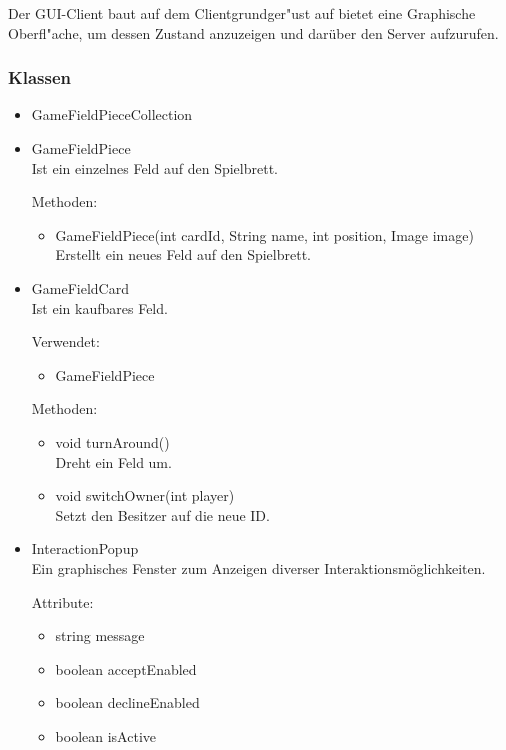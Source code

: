\documentclass[a4paper,10pt]{article}
\begin{document}
Der GUI-Client baut auf dem Clientgrundger"ust auf bietet eine Graphische Oberfl"ache, um dessen Zustand anzuzeigen und darüber den Server aufzurufen.

\subsubsection{Klassen}

\begin{itemize}
\item GameFieldPieceCollection\\

\item GameFieldPiece\\
Ist ein einzelnes Feld auf den Spielbrett.

Methoden:
\begin{itemize}
\item GameFieldPiece(int cardId, String name, int position, Image image)
Erstellt ein neues Feld auf den Spielbrett.
\end{itemize}

\item GameFieldCard \\
Ist ein kaufbares Feld.

Verwendet:
\begin{itemize}
\item GameFieldPiece
\end{itemize}

Methoden:
\begin{itemize}
\item void turnAround() \\
Dreht ein Feld um.
\item void switchOwner(int player) \\
Setzt den Besitzer auf die neue ID.
\end{itemize}

\item InteractionPopup \\
Ein graphisches Fenster zum Anzeigen diverser Interaktionsmöglichkeiten.

Attribute:
\begin{itemize}
\item string message
\item boolean acceptEnabled
\item boolean declineEnabled
\item boolean isActive
\end{itemize}


\end{itemize}
\end{document}
